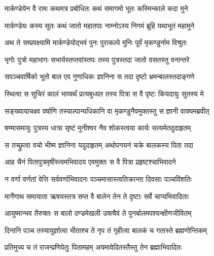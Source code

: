 

\translink{}

\storymeta



\twolineshloka
{मार्कण्डेयेन वै रामः कथमत्र प्रबोधितः}
{कथं समागमो भूतः कस्मिन्काले कदा मुने} %

\twolineshloka
{मार्कण्डेयः कस्य सुतः कथं जातो महातपाः}
{नाम्नोऽस्य निगमं ब्रूहि यथाभूतं महामुने} %

\twolineshloka
{अथ ते सम्प्रवक्ष्यामि मार्कण्डेयोद्भवं पुनः}
{पुराकल्पे मुनिः पूर्वं मृकण्डुर्नाम विश्रुतः} %

\twolineshloka
{भृगोः पुत्रो महाभागः सभार्यस्तप्तवांस्तपः}
{तस्य पुत्रस्तदा जातो वसतस्तु वनान्तरे} %

\twolineshloka
{सपञ्चवार्षिको भूतो बाल एव गुणाधिकः}
{ज्ञानिना स तदा दृष्टो भ्रमन्बालस्तदाङ्गणे} %

\twolineshloka
{स्थित्वा स सुचिरं कालं भाव्यर्थं प्रत्यबुध्यत}
{तस्य पित्रा स वै पृष्टः कियदायुः सुतस्य मे} %

\twolineshloka
{सङ्ख्यायाचक्ष्व वर्षाणि तस्याल्पान्यधिकानि वा}
{मृकण्डुनैवमुक्तस्तु स ज्ञानी वाक्यमब्रवीत्} %

\twolineshloka
{षण्मासमायुः पुत्रस्य धात्रा सृष्टं मुनीश्वर}
{नैव शोकस्त्वया कार्यः सत्यमेतदुदाहृतम्} %

\twolineshloka
{स तच्छ्रुत्वा वचो भीष्म ज्ञानिना यदुदाहृतम्}
{अथोपनयनं चक्रे बालकस्य पिता तदा} %

\twolineshloka
{आह चैनं पितापुत्रमृषींस्त्वमभिवादय}
{एवमुक्तः स वै पित्रा प्रहृष्टश्चाभिवादने} %

\twolineshloka
{न वर्णा वर्णतां वेत्ति सर्ववर्णाभिवादनः}
{पञ्चमासास्त्वतिक्रान्ता दिवसाः पञ्चविंशतिः} %

\twolineshloka
{मार्गेणाथ समायाता ऋषयस्तत्र सप्त वै}
{बालेन तेन ते दृष्टाः सर्वे चाप्यभिवादिताः} %

\twolineshloka
{आयुष्मान्भव तैरुक्तः स बालो दण्डमेखली}
{उक्त्वैवं ते पुनर्बालमपश्यन्क्षीणजीवितम्} %

\twolineshloka
{दिनानि पञ्च तस्यायुर्ज्ञात्वा भीताश्च ते नृप}
{तं गृहीत्वा बालकं च गतास्ते ब्रह्मणोन्तिकम्} %

\twolineshloka
{प्रतिमुच्य च तं राजन्प्रणिपेतुः पितामहम्}
{अयमावेदितस्तैस्तु तेन ब्रह्माभिवादितः} %

